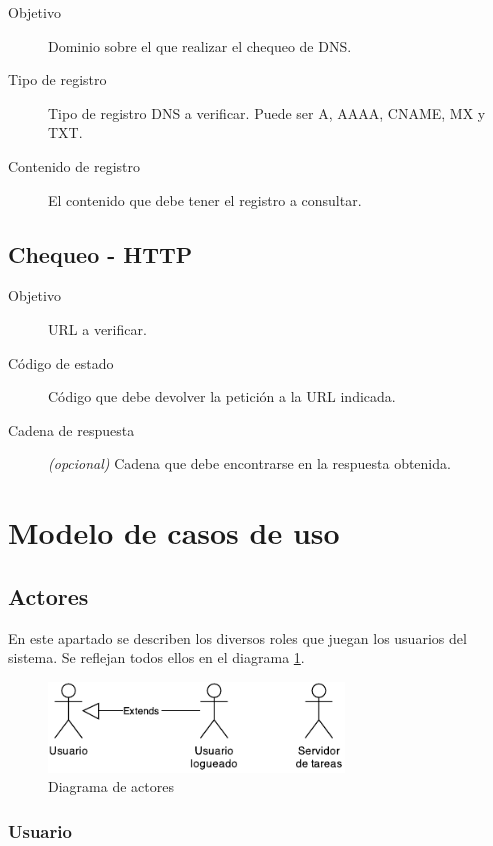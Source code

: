 \begin{description}
\item[Objetivo] Dominio sobre el que realizar el chequeo de DNS.
\item[Tipo de registro] Tipo de registro DNS a verificar. Puede ser A, AAAA, CNAME, MX y TXT.
\item[Contenido de registro] El contenido que debe tener el registro a consultar.
\end{description}

\subsection{Chequeo - HTTP}

\begin{description}
\item[Objetivo] URL a verificar.
\item[Código de estado] Código que debe devolver la petición a la URL indicada.
\item[Cadena de respuesta] \textit{(opcional)} Cadena que debe encontrarse en la
  respuesta obtenida.
\end{description}



\section{Modelo de casos de uso}

\subsection{Actores}

En este apartado se describen los diversos roles que juegan los usuarios del
sistema. Se reflejan todos ellos en el diagrama \ref{fig:actores}.

\begin{figure}[h]
  \centering
  \includegraphics[width=0.7\textwidth]{4_analisis/diagrama_actores}
  \caption{Diagrama de actores}
  \label{fig:actores}
\end{figure}

\subsubsection{Usuario}

